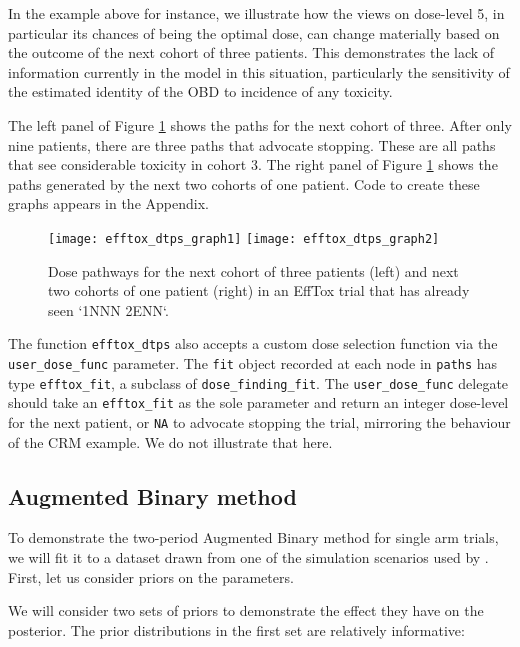 \documentclass[article]{jss}
\begin{document}
In the example above for instance, we illustrate how the views on
dose-level 5, in particular its chances of being the optimal dose, can
change materially based on the outcome of the next cohort of three
patients. This demonstrates the lack of information currently in the
model in this situation, particularly the sensitivity of the estimated
identity of the OBD to incidence of any toxicity.

The left panel of Figure \ref{fig:efftox_dtps_graph} shows the paths for
the next cohort of three. After only nine patients, there are three
paths that advocate stopping. These are all paths that see considerable
toxicity in cohort 3. The right panel of Figure
\ref{fig:efftox_dtps_graph} shows the paths generated by the next two
cohorts of one patient. Code to create these graphs appears in the
Appendix.

\begin{figure}
  \centering
  \texttt{[image: efftox\_dtps\_graph1]}
  \texttt{[image: efftox\_dtps\_graph2]}
  \caption{Dose pathways for the next cohort of three patients (left) and next two cohorts of one patient (right) in an EffTox trial that has already seen `1NNN 2ENN`.}
  \label{fig:efftox_dtps_graph}
\end{figure}

The function \texttt{efftox\_dtps} also accepts a custom dose selection
function via the \texttt{user\_dose\_func} parameter. The \texttt{fit}
object recorded at each node in \texttt{paths} has type
\texttt{efftox\_fit}, a subclass of \texttt{dose\_finding\_fit}. The
\texttt{user\_dose\_func} delegate should take an \texttt{efftox\_fit}
as the sole parameter and return an integer dose-level for the next
patient, or \texttt{NA} to advocate stopping the trial, mirroring the
behaviour of the CRM example. We do not illustrate that here.

\hypertarget{augmented-binary-method-1}{%
\subsection{Augmented Binary method}\label{augmented-binary-method-1}}

To demonstrate the two-period Augmented Binary method for single arm
trials, we will fit it to a dataset drawn from one of the simulation
scenarios used by \citet{Wason2013}. First, let us consider priors on
the parameters.

We will consider two sets of priors to demonstrate the effect they have
on the posterior. The prior distributions in the first set are
relatively informative:
\end{document}
